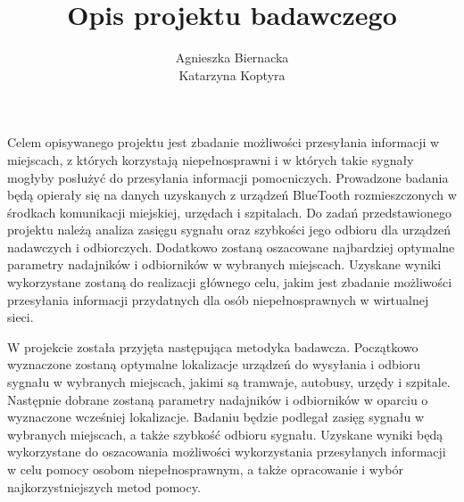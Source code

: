 \documentclass[a4paper]{article}
\begin{document}
\title{Opis projektu badawczego}
\author{Agnieszka Biernacka\\ Katarzyna Koptyra}
\maketitle

Celem opisywanego projektu jest zbadanie możliwości przesyłania informacji w miejscach, z których korzystają niepełnosprawni i w których takie sygnały mogłyby posłużyć do przesyłania informacji pomocniczych. Prowadzone badania będą opierały się na danych uzyskanych z urządzeń BlueTooth rozmieszczonych w środkach komunikacji miejskiej, urzędach i szpitalach. Do zadań przedstawionego projektu należą analiza zasięgu sygnału oraz szybkości jego odbioru dla urządzeń nadawczych i odbiorczych. Dodatkowo zostaną oszacowane najbardziej optymalne parametry nadajników i odbiorników w wybranych miejscach. Uzyskane wyniki wykorzystane zostaną do realizacji głównego celu, jakim jest zbadanie możliwości przesyłania informacji przydatnych dla osób niepełnosprawnych w wirtualnej sieci.

W projekcie została przyjęta następująca metodyka badawcza. Początkowo wyznaczone zostaną optymalne lokalizacje urządzeń do wysyłania i odbioru sygnału w wybranych miejscach, jakimi są tramwaje, autobusy, urzędy i szpitale. Następnie dobrane zostaną parametry nadajników i odbiorników w oparciu o wyznaczone wcześniej lokalizacje. Badaniu będzie podlegał zasięg sygnału w wybranych miejscach, a także szybkość odbioru sygnału. Uzyskane wyniki będą wykorzystane do oszacowania możliwości wykorzystania przesyłanych informacji w celu pomocy osobom niepełnosprawnym, a także opracowanie i wybór najkorzystniejszych metod pomocy.
\end{document}
